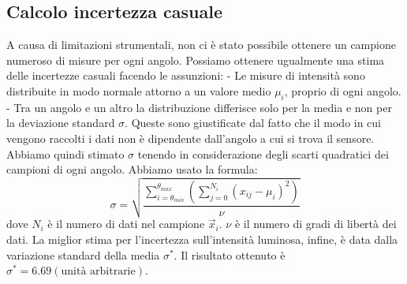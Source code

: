 \subsection{Calcolo incertezza casuale}\label{subsec:calcolo-incertezza-casuale}
  A causa di limitazioni strumentali, non ci è stato possibile ottenere un campione
  numeroso di misure per ogni angolo. Possiamo ottenere ugualmente
  una stima delle incertezze casuali facendo le assunzioni: %
  - Le misure di intensità sono distribuite in modo normale attorno a un valore
    medio $\mu_i$, proprio di ogni angolo.
  - Tra un angolo e un altro la distribuzione differisce solo per la media e non per la
    deviazione standard $\sigma$.
  Queste sono giustificate dal fatto che il modo in cui vengono raccolti i dati
  non è dipendente dall'angolo a cui si trova il sensore.
  Abbiamo quindi stimato $\sigma$ tenendo in considerazione degli scarti quadratici
  dei campioni di ogni angolo.
  Abbiamo usato la formula:
  \begin{equation}
    \sigma = \sqrt{
      \frac {
        \sum_{i = \theta_{min}}^{\theta_{max}} \left(
          \sum_{j = 0}^{N_i} (x_{ij} -\mu_i)^2
        \right)
      } {
        \nu
      }
    }
  \end{equation}
  \noindent dove $N_i$ è il numero di dati nel campione $\vec{x}_i$.
  $\nu$ è il numero di gradi di libertà dei dati. La miglior stima per l'incertezza
  sull'intensità luminosa, infine, è data dalla variazione standard della media $\sigma^*$.
  Il risultato ottenuto è $\sigma^* = 6.69 (\text{unità arbitrarie})$.
\endinput

